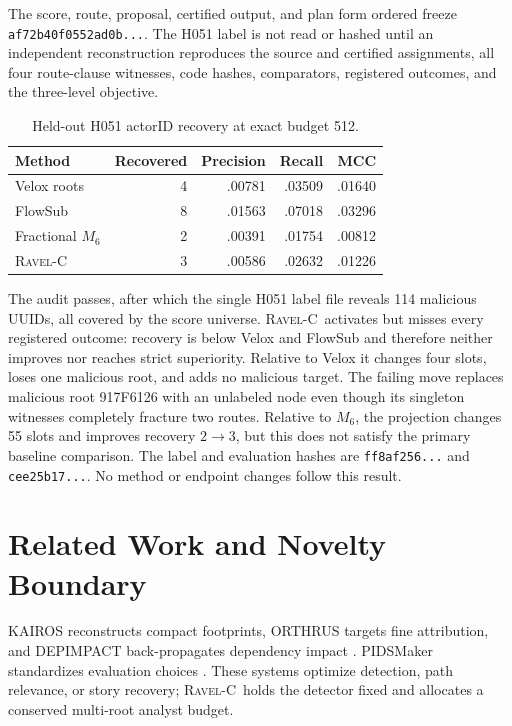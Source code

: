 \documentclass[runningheads]{llncs}
\newcommand{\ravelc}{\textsc{Ravel-C}}
\begin{document}
The score, route, proposal, certified output, and plan form ordered freeze \texttt{af72b40f0552ad0b...}. The H051 label is not read or hashed until an independent reconstruction reproduces the source and certified assignments, all four route-clause witnesses, code hashes, comparators, registered outcomes, and the three-level objective.

\begin{table}[h]
\caption{Held-out H051 actorID recovery at exact budget 512.}
\label{tab:h051}
\centering
\small
\setlength{\tabcolsep}{5pt}
\begin{tabular}{lrrrr}
\toprule
Method & Recovered & Precision & Recall & MCC\\
\midrule
Velox roots & 4 & .00781 & .03509 & .01640\\
FlowSub & 8 & .01563 & .07018 & .03296\\
Fractional \(M_6\) & 2 & .00391 & .01754 & .00812\\
\ravelc & 3 & .00586 & .02632 & .01226\\
\bottomrule
\end{tabular}
\end{table}

The audit passes, after which the single H051 label file reveals 114 malicious UUIDs, all covered by the score universe. \ravelc\ activates but misses every registered outcome: recovery is below Velox and FlowSub and therefore neither improves nor reaches strict superiority. Relative to Velox it changes four slots, loses one malicious root, and adds no malicious target. The failing move replaces malicious root 917F6126 with an unlabeled node even though its singleton witnesses completely fracture two routes. Relative to \(M_6\), the projection changes 55 slots and improves recovery \(2\!\rightarrow\!3\), but this does not satisfy the primary baseline comparison. The label and evaluation hashes are \texttt{ff8af256...} and \texttt{cee25b17...}. No method or endpoint changes follow this result.

\section{Related Work and Novelty Boundary}

KAIROS reconstructs compact footprints, ORTHRUS targets fine attribution, and DEPIMPACT back-propagates dependency impact \cite{cheng2024kairos,jiang2025orthrus,fang2022depimpact}. PIDSMaker standardizes evaluation choices \cite{bilot2026pidsmaker}. These systems optimize detection, path relevance, or story recovery; \ravelc\ holds the detector fixed and allocates a conserved multi-root analyst budget.
\end{document}
